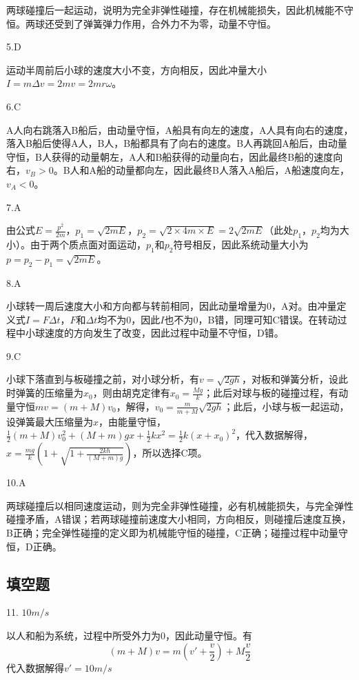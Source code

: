 \documentclass[blue, normal]{./templete/qyxfnote}
\begin{document}
\begin{multicols}{2}
			两球碰撞后一起运动，说明为完全非弹性碰撞，存在机械能损失，因此机械能不守恒。两球还受到了弹簧弹力作用，合外力不为零，动量不守恒。
			
			5.D
			
			运动半周前后小球的速度大小不变，方向相反，因此冲量大小\(I=m\Delta v=2mv=2mr \omega\)。
			
			6.C
			
			A人向右跳落入B船后，由动量守恒，A船具有向左的速度，A人具有向右的速度，落入B船后使得A人，B人，B船都具有了向右的速度。B人再跳回A船后，由动量守恒，B人获得的动量朝左，A人和B船获得的动量向右，因此最终B船的速度向右，\(v_B>0\)。B人和A船的动量都向左，因此最终B人落入A船后，A船速度向左，\(v_A<0\)。
			
			7.A
			
			由公式\(E=\frac{p^2}{2m}\)，\(p_1=\sqrt{2mE}\)，\(p_2=\sqrt{2\times 4m\times E}=2\sqrt{2mE}\)（此处\(p_1\)，\(p_2\)均为大小）。由于两个质点面对面运动，\(p_1\)和\(p_2\)符号相反，因此系统动量大小为\(p=p_2-p_1=\sqrt{2mE}\)。
			
			8.A
			
			小球转一周后速度大小和方向都与转前相同，因此动量增量为0，A对。由冲量定义式\(I=F\Delta t\)，\(F\)和\(\Delta t\)均不为0，因此\(I\)也不为0，B错，同理可知C错误。在转动过程中小球速度的方向发生了改变，因此过程中动量不守恒，D错。
			
			9.C
			
			小球下落直到与板碰撞之前，对小球分析，有\(v=\sqrt{2gh}\)，对板和弹簧分析，设此时弹簧的压缩量为\(x_0\)，则由胡克定律有\(x_0=\frac{Mg}{k}\)；此后对球与板的碰撞过程，有动量守恒\(mv=(m+M)v_0\)，解得，\(v_0=\frac{m}{m+M}\sqrt{2gh}\)；此后，小球与板一起运动，设弹簧最大压缩量为\(x\)，由能量守恒，\(\frac{1}{2}(m+M)v_0^2+(M+m)gx+\frac{1}{2}kx^2=\frac{1}{2}k(x+x_0)^2\)，代入数据解得，\(x=\frac{mg}{k}(1+\sqrt{1+\frac{2kh}{(M+m)g}})\)，所以选择C项。
			
			10.A
			
			两球碰撞后以相同速度运动，则为完全非弹性碰撞，必有机械能损失，与完全弹性碰撞矛盾，A错误；若两球碰撞前速度大小相同，方向相反，则碰撞后速度互换，B正确；完全弹性碰撞的定义即为机械能守恒的碰撞，C正确；碰撞过程中动量守恒，D正确。
		\subsection{填空题}
			11. $10m/s$
			
			以人和船为系统，过程中所受外力为$ 0 $，因此动量守恒。有
			\begin{equation*}
			(m+M)v=m(v'+\frac{v}{2})+M\frac{v}{2} 
			\end{equation*}
			代入数据解得$ v'=10m/s $
			

\end{multicols}
\end{document}
